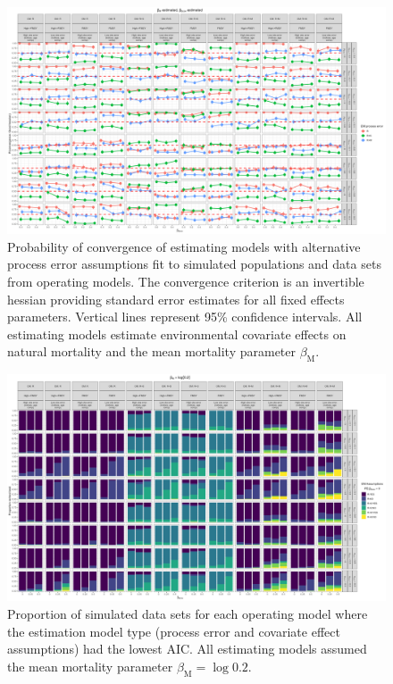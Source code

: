 \documentclass[
  12pt,
]{article}
\begin{document}
\begin{landscape}
\begin{figure}
\caption{Probability of convergence of estimating models with alternative process error assumptions fit to simulated populations and data sets from operating models. The convergence criterion is an invertible hessian providing standard error estimates for all fixed effects parameters. Vertical lines represent 95\% confidence intervals. All estimating models estimate environmental covariate effects on natural mortality and the mean mortality parameter $\beta_\text{M}$.}\label{convergence_M_estimated}
\begin{center}
\includegraphics[height = \textheight]{proportion_good_hessian_ecov_effect_est_M_est.png}
\end{center}
\end{figure}
\end{landscape}

\begin{landscape}
\begin{figure}
\caption{Proportion of simulated data sets for each operating model where the estimation model type (process error and covariate effect assumptions) had the lowest AIC. All estimating models assumed the mean mortality parameter $\beta_\text{M} = \log 0.2$.}\label{aic_rank_M_fixed}
\begin{center}
\includegraphics[height = \textheight]{proportion_best_AIC_M_fixed.png}
\end{center}
\end{figure}
\end{landscape}
\end{document}
